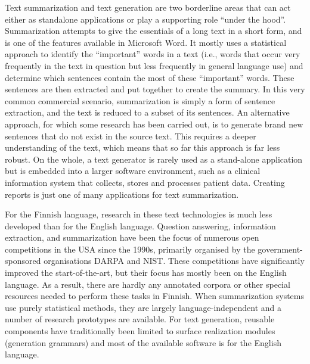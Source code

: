 \documentclass[]{../../metanetpaper}
\begin{document}
\begin{Parallel}[c]{77mm}{77mm}
{Text summarization and text generation are two borderline areas that can act
either as standalone applications or play a supporting role “under the hood”.
Summarization attempts to give the essentials of a long text in a short form,
and is one of the features available in Microsoft Word. It mostly uses a
statistical approach to identify the “important” words in a text (i.e., words
that occur very frequently in the text in question but less frequently in
general language use) and determine which sentences contain the most of these
“important” words. These sentences are then extracted and put together to
create the summary. In this very common commercial scenario, summarization is
simply a form of sentence extraction, and the text is reduced to a subset of
its sentences. An alternative approach, for which some research has been
carried out, is to generate brand new sentences that do not exist in the source
text. This requires a deeper understanding of the text, which means that so far
this approach is far less robust. On the whole, a text generator is rarely used
as a stand-alone application but is embedded into a larger software
environment, such as a clinical information system that collects, stores and
processes patient data. Creating reports is just one of many applications for
text summarization.

For the Finnish language, research in these text technologies is much less
developed than for the English language. Question answering, information
extraction, and summarization have been the focus of numerous open competitions
in the USA since the 1990s, primarily organised by the government-sponsored
organisations DARPA and NIST. These competitions have significantly improved
the start-of-the-art, but their focus has mostly been on the English language.
As a result, there are hardly any annotated corpora or other special resources
needed to perform these tasks in Finnish. When summarization systems use purely
statistical methods, they are largely language-independent and a number of
research prototypes are available. For text generation, reusable components
have traditionally been limited to surface realization modules (generation
grammars) and most of the available software is for the English language.
}

\ParallelPar



\end{Parallel}
\end{document}
